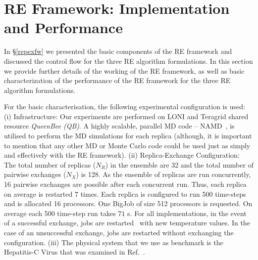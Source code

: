 \documentclass{rspublic}
\newcommand{\jhanote}[1]{ {\textcolor{red} { ***shantenu: #1 }}}
\newcommand{\alnote}[1]{ {\textcolor{blue} { ***andre: #1 }}}
\newcommand{\athotanote}[1]{ {\textcolor{green} { ***athota: #1 }}}
\newcommand{\alnote}[1]{}
\newcommand{\athotanote}[1]{}
\newcommand{\jhanote}[1]{}
\begin{document}
\section{RE Framework: Implementation and Performance}
\label{sec:re_impl}

In \S\ref{repexfw} we presented the basic components of the RE
framework and discussed the control flow for the three RE algorithm
formulations.  In this section we provide further details of the
working of the RE framework, as well as basic characterization of the
performance of the RE framework for the three RE algorithm formulations.


For the basic characterisation, the following experimental
configuration is used: (i) Infrastructure: Our experiments are
performed on LONI and Teragrid shared resource \emph{QueenBee (QB)}. A
highly scalable, parallel MD code -- NAMD~\citep{Phillips:2005gd}, is
utilised to perform the MD simulations for each replica (although, it
is important to mention that any other MD or Monte Carlo code could be
used just as simply and effectively with the RE framework).  (ii)
Replica-Exchange Configuration: The total number of replicas ($N_R$)
in the ensemble are 32 and the total number of pairwise exchanges
($N_X$) is 128. As the ensemble of replicas are run concurrently, 16
pairwise exchanges are possible after each concurrent run. Thus, each
replica on average is restarted 7 times.  Each replica is configured
to run 500 time-steps and is allocated 16 processors. One BigJob of
size 512 processors is requested. On average each 500 time-step run
takes $71$ s.  For all implementations, in the event of a
successful exchange, jobs are restarted~\citep{Luckow:2008fp} with new
temperature values.  In the case of an unsuccessful exchange, jobs are
restarted without exchanging the configuration.  (iii) The physical
system that we use as benchmark is the Hepatitis-C Virus that was
examined in Ref.~\cite{Luckow:2008fp}.
\end{document}
